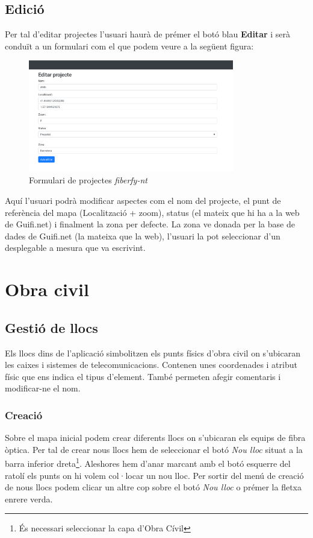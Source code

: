 \documentclass[a4paper]{article}
\begin{document}
	\subsection{Edició}
	Per tal d'editar projectes l'usuari haurà de prémer el botó blau \textbf{Editar} i serà conduït a un formulari com el que podem veure a la següent figura:
	
	\begin{figure}[H]
		\centering
		\includegraphics[width=0.8\textwidth]{images/project_edit_form.png}
		\caption{Formulari de projectes \emph{fiberfy-nt}}
	\end{figure}

	Aquí l'usuari podrà modificar aspectes com el nom del projecte, el punt de referència del mapa (Localització + zoom), status (el mateix que hi ha a la web de Guifi.net) i finalment la zona per defecte. La zona ve donada per la base de dades de Guifi.net (la mateixa que la web), l'usuari la pot seleccionar d'un desplegable a mesura que va escrivint.
	
	\newpage
	\section{Obra civil}
	\subsection{Gestió de llocs}
	Els llocs dins de l'aplicació simbolitzen els punts físics d'obra civil on s'ubicaran les caixes i sistemes de telecomunicacions. Contenen unes coordenades i atribut físic que ens indica el tipus d'element. També permeten afegir comentaris i modificar-ne el nom.
	
	\subsubsection{Creació}
	Sobre el mapa inicial podem crear diferents llocs on s'ubicaran els equips de fibra òptica. Per tal de crear nous llocs hem de seleccionar el botó \emph{Nou lloc} situat a la barra inferior dreta\footnote{És necessari seleccionar la capa d'Obra Cívil}. Aleshores hem d'anar marcant amb el botó esquerre del ratolí els punts on hi volem col·locar un nou lloc. Per sortir del menú de creació de nous llocs podem clicar un altre cop sobre el botó \emph{Nou lloc} o prémer la fletxa enrere verda.
	
\end{document}
